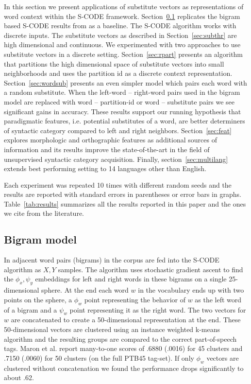 In this section we present applications of substitute vectors as
representations of word context within the S-CODE framework.
Section~\ref{sec:bigram} replicates the bigram based S-CODE results
from \cite{maron2010sphere} as a baseline.  The S-CODE algorithm works
with discrete inputs.  The substitute vectors as described in
Section~\ref{sec:subthr} are high dimensional and continuous.  We
experimented with two approaches to use substitute vectors in a
discrete setting.  Section~\ref{sec:rpart} presents an algorithm that
partitions the high dimensional space of substitute vectors into small
neighborhoods and uses the partition id as a discrete context
representation.  Section~\ref{sec:wordsub} presents an even simpler
model which pairs each word with a random substitute.  When the
left-word -- right-word pairs used in the bigram model are replaced
with word -- partition-id or word -- substitute pairs we see
significant gains in accuracy.  These results support our running
hypothesis that paradigmatic features, i.e. potential substitutes of a
word, are better determiners of syntactic category compared to left
and right neighbors.  Section~\ref{sec:feat} explores morphologic and
orthographic features as additional sources of information and its
results improve the state-of-the-art in the field of unsupervised
syntactic category acquisition.  Finally, section~\ref{sec:multilang}
extends best performing setting to 14 languages other than English.

Each experiment was repeated 10 times with different random seeds and
the results are reported with standard errors in parentheses or error
bars in graphs.  Table~\ref{tab:results} summarizes all the results
reported in this paper and the ones we cite from the literature.

\subsection{Bigram model}\label{sec:bigram}

In \cite{maron2010sphere} adjacent word pairs (bigrams) in the corpus
are fed into the S-CODE algorithm as $X, Y$ samples.  The algorithm
uses stochastic gradient ascent to find the $\phi_x, \psi_y$
embeddings for left and right words in these bigrams on a single
25-dimensional sphere.  At the end each word $w$ in the vocabulary
ends up with two points on the sphere, a $\phi_w$ point representing
the behavior of $w$ as the left word of a bigram and a $\psi_w$ point
representing it as the right word.  The two vectors for $w$ are
concatenated to create a 50-dimensional representation at the end.
These 50-dimensional vectors are clustered using an instance weighted
k-means algorithm and the resulting groups are compared to the correct
part-of-speech tags.  Maron et al.  report
many-to-one scores of .6880 (.0016) for 45 clusters and .7150 (.0060)
for 50 clusters (on the full PTB45 tag-set).  If only $\phi_w$ vectors
are clustered without concatenation we found the performance drops
significantly to about .62.

